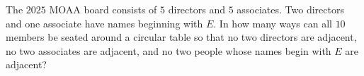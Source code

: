 The $2025$ MOAA board consists of $5$ directors and $5$ associates. Two directors and one associate have names beginning with $E$. In how many ways can all $10$ members be seated around a circular table so that no two directors are adjacent, no two associates are adjacent, and no two people whose names begin with $E$ are adjacent?
